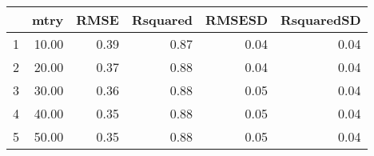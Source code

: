 \begin{table}[ht]
\centering
\begin{tabular}{rrrrrr}
  \hline
 & mtry & RMSE & Rsquared & RMSESD & RsquaredSD \\ 
  \hline
1 & 10.00 & 0.39 & 0.87 & 0.04 & 0.04 \\ 
  2 & 20.00 & 0.37 & 0.88 & 0.04 & 0.04 \\ 
  3 & 30.00 & 0.36 & 0.88 & 0.05 & 0.04 \\ 
  4 & 40.00 & 0.35 & 0.88 & 0.05 & 0.04 \\ 
  5 & 50.00 & 0.35 & 0.88 & 0.05 & 0.04 \\ 
   \hline
\end{tabular}
\end{table}
